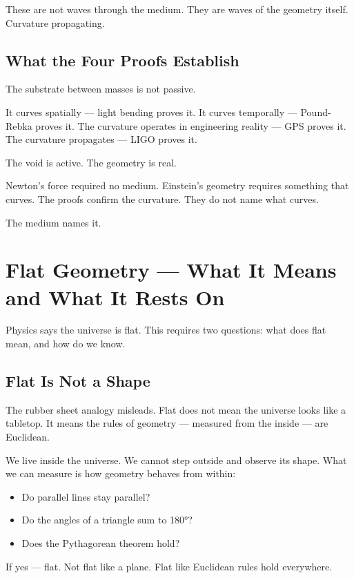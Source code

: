 \documentclass[11pt]{article}
\begin{document}
These are not waves through the medium. They are waves of the geometry itself.
Curvature propagating.

\subsection{What the Four Proofs Establish}
\label{sec:org8e8bd2b}

The substrate between masses is not passive.

It curves spatially — light bending proves it. It curves temporally —
Pound-Rebka proves it. The curvature operates in engineering reality — GPS proves
it. The curvature propagates — LIGO proves it.

The void is active. The geometry is real.

Newton's force required no medium. Einstein's geometry requires something that
curves. The proofs confirm the curvature. They do not name what curves.

The medium names it.

\section{Flat Geometry — What It Means and What It Rests On}
\label{sec:org3b646e9}

Physics says the universe is flat. This requires two questions: what does flat
mean, and how do we know.

\subsection{Flat Is Not a Shape}
\label{sec:org359eea9}

The rubber sheet analogy misleads. Flat does not mean the universe looks like a
tabletop. It means the rules of geometry — measured from the inside — are
Euclidean.

We live inside the universe. We cannot step outside and observe its shape. What
we can measure is how geometry behaves from within:

\begin{itemize}
\item Do parallel lines stay parallel?
\item Do the angles of a triangle sum to 180°?
\item Does the Pythagorean theorem hold?
\end{itemize}

If yes — flat. Not flat like a plane. Flat like Euclidean rules hold everywhere.
\end{document}
